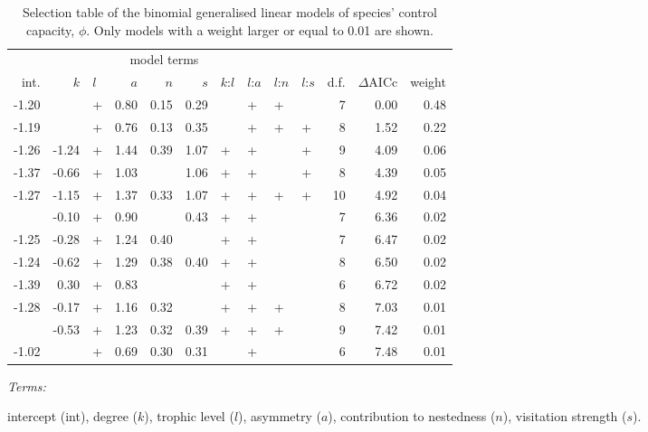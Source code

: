 \documentclass[a4paper]{artikel1}
\theoremstyle{definition}
\theoremstyle{definition}
\theoremstyle{definition}
\theoremstyle{remark}
\begin{document}
\begin{table}

\caption{\label{tab:tab-model-selection-table}Selection table of the binomial generalised linear models of species' control capacity, $\phi$. Only models with a weight larger or equal to 0.01 are shown.}
\centering
\fontsize{8}{10}\selectfont
\begin{threeparttable}
\begin{tabular}[t]{rrlrrrllllrrr}
\toprule
\multicolumn{10}{c}{model terms} & \multicolumn{ 3}{c}{ } \\
\cmidrule(l{2pt}r{2pt}){1-10}
int. & $k$ & $l$ & $a$ & $n$ & $s$ & $k$:$l$ & $l$:$a$ & $l$:$n$ & $l$:$s$ & d.f. & $\Delta$AICc & weight\\
\midrule
-1.20 &  & + & 0.80 & 0.15 & 0.29 &  & + & + &  & 7 & 0.00 & 0.48\\
-1.19 &  & + & 0.76 & 0.13 & 0.35 &  & + & + & + & 8 & 1.52 & 0.22\\
-1.26 & -1.24 & + & 1.44 & 0.39 & 1.07 & + & + &  & + & 9 & 4.09 & 0.06\\
-1.37 & -0.66 & + & 1.03 &  & 1.06 & + & + &  & + & 8 & 4.39 & 0.05\\
-1.27 & -1.15 & + & 1.37 & 0.33 & 1.07 & + & + & + & + & 10 & 4.92 & 0.04\\
\addlinespace
-1.37 & -0.10 & + & 0.90 &  & 0.43 & + & + &  &  & 7 & 6.36 & 0.02\\
-1.25 & -0.28 & + & 1.24 & 0.40 &  & + & + &  &  & 7 & 6.47 & 0.02\\
-1.24 & -0.62 & + & 1.29 & 0.38 & 0.40 & + & + &  &  & 8 & 6.50 & 0.02\\
-1.39 & 0.30 & + & 0.83 &  &  & + & + &  &  & 6 & 6.72 & 0.02\\
-1.28 & -0.17 & + & 1.16 & 0.32 &  & + & + & + &  & 8 & 7.03 & 0.01\\
\addlinespace
-1.26 & -0.53 & + & 1.23 & 0.32 & 0.39 & + & + & + &  & 9 & 7.42 & 0.01\\
-1.02 &  & + & 0.69 & 0.30 & 0.31 &  & + &  &  & 6 & 7.48 & 0.01\\
\bottomrule
\end{tabular}
\begin{tablenotes}[para]
\item \textit{Terms: } 
\item intercept (int), degree ($k$), trophic level ($l$), asymmetry ($a$), contribution to nestedness ($n$), visitation strength ($s$).
\end{tablenotes}
\end{threeparttable}
\end{table}
\end{document}
